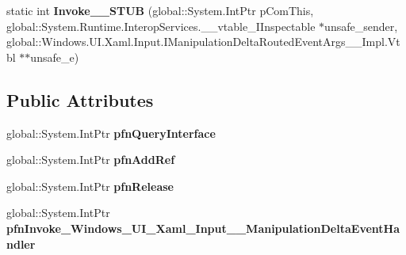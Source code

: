 \begin{DoxyCompactItemize}
\item 
\mbox{\label{struct_windows_1_1_u_i_1_1_xaml_1_1_input_1_1_manipulation_delta_event_handler_____impl_1_1_vtbl_ab3e2e71d4d944fd98d58c8ed8ed5c885}} 
static int {\bfseries Invoke\+\_\+\+\_\+\+S\+T\+UB} (global\+::\+System.\+Int\+Ptr p\+Com\+This, global\+::\+System.\+Runtime.\+Interop\+Services.\+\_\+\+\_\+vtable\+\_\+\+I\+Inspectable $\ast$unsafe\+\_\+sender, global\+::\+Windows.\+U\+I.\+Xaml.\+Input.\+I\+Manipulation\+Delta\+Routed\+Event\+Args\+\_\+\+\_\+\+Impl.\+Vtbl $\ast$$\ast$unsafe\+\_\+e)
\end{DoxyCompactItemize}
\subsection*{Public Attributes}
\begin{DoxyCompactItemize}
\item 
\mbox{\label{struct_windows_1_1_u_i_1_1_xaml_1_1_input_1_1_manipulation_delta_event_handler_____impl_1_1_vtbl_ab4ad84615a01de92b06ea874989affa2}} 
global\+::\+System.\+Int\+Ptr {\bfseries pfn\+Query\+Interface}
\item 
\mbox{\label{struct_windows_1_1_u_i_1_1_xaml_1_1_input_1_1_manipulation_delta_event_handler_____impl_1_1_vtbl_a157347091293bc8742ed0a8583bdd404}} 
global\+::\+System.\+Int\+Ptr {\bfseries pfn\+Add\+Ref}
\item 
\mbox{\label{struct_windows_1_1_u_i_1_1_xaml_1_1_input_1_1_manipulation_delta_event_handler_____impl_1_1_vtbl_a481c4f6056b8e1aa4a79187260cefdad}} 
global\+::\+System.\+Int\+Ptr {\bfseries pfn\+Release}
\item 
\mbox{\label{struct_windows_1_1_u_i_1_1_xaml_1_1_input_1_1_manipulation_delta_event_handler_____impl_1_1_vtbl_a56da9477aed9ac097e9d392295f73b03}} 
global\+::\+System.\+Int\+Ptr {\bfseries pfn\+Invoke\+\_\+\+Windows\+\_\+\+U\+I\+\_\+\+Xaml\+\_\+\+Input\+\_\+\+\_\+\+Manipulation\+Delta\+Event\+Handler}
\end{DoxyCompactItemize}
